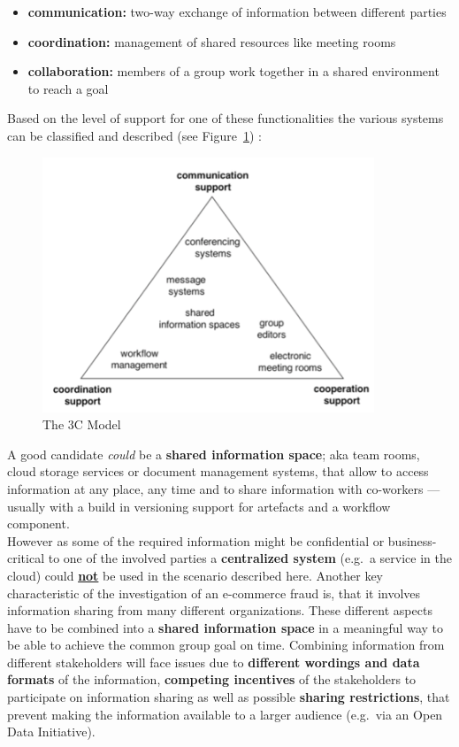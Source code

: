 \begin{itemize}
    \item\textbf{communication:} two-way exchange of information between different parties
    \item\textbf{coordination:} management of shared resources like meeting rooms
    \item\textbf{collaboration:} members of a group work together in a shared environment to reach a goal
\end{itemize}

Based on the level of support for one of these functionalities the various systems can be classified and described (see Figure~\ref{fig:images_3C_model}) \citep{Koch2008}:

\begin{figure}[H]
	\centering
		\includegraphics[height=3in]{images/3C-model.png}
	\caption{The 3C Model \citep{Koch2008}}
\label{fig:images_3C_model}
\end{figure}

A good candidate \textit{could} be a \textbf{shared information space}; aka team rooms, cloud storage services or document management systems, that allow to access information at any place,
any time and to share information with co-workers --- usually with a build in versioning support for artefacts and a workflow component. \\

However as some of the required information might be confidential or business-critical to one of the involved parties a \textbf{centralized system} (e.g.\ a service in the cloud) could \textbf{\underline{not}} be used in the scenario described here.
Another key characteristic of the investigation of an e-commerce fraud is, that it involves information sharing from many different organizations. These different aspects have to be combined into a \textbf{shared information space} in a meaningful way
to be able to achieve the common group goal on time. Combining information from different stakeholders will face issues due to \textbf{different wordings and data formats} of the information,
\textbf{competing incentives} of the stakeholders to participate on information sharing as well as possible \textbf{sharing restrictions}, that prevent making the information available to a larger audience (e.g.\ via an Open Data Initiative). \\

